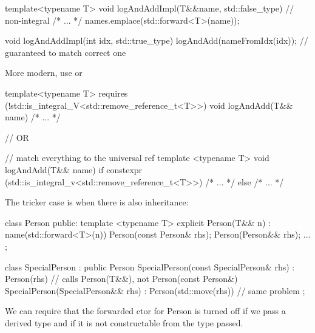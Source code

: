 \begin{cppcode}
template<typename T>
void logAndAddImpl(T&&name, std::false_type) { // non-integral
  /* ... */
  names.emplace(std::forward<T>(name));
}

void logAndAddImpl(int idx, std::true_type) { logAndAdd(nameFromIdx(idx)); // guaranteed to match correct one}
\end{cppcode}
More modern, use  or 
\begin{cppcode}
template<typename T>
  requires (!std::is_integral_V<std::remove_reference_t<T>>)
void logAndAdd(T&& name) {/* ... */}

// OR

// match everything to the universal ref
template <typename T>
void logAndAdd(T&& name) {
  if constexpr (std::is_integral_v<std::remove_reference_t<T>>) {
    /* ... */
  } else {
    /* ... */
  }
}
\end{cppcode}
The tricker case is when there is also inheritance:
\begin{cppcode}
class Person {
public:
    template <typename T>
    explicit Person(T&& n) : name(std::forward<T>(n)) {}
    Person(const Person& rhs);
    Person(Person&& rhs);
    ...
};

class SpecialPerson : public Person {
    SpecialPerson(const SpecialPerson& rhs) : Person(rhs) {}       // calls Person(T&&), not Person(const Person&)
    SpecialPerson(SpecialPerson&& rhs) : Person(std::move(rhs)) {} // same problem
};
\end{cppcode}
We can require that the forwarded ctor for Person is turned off if we pass a derived type and if it is not constructable from the type passed.
